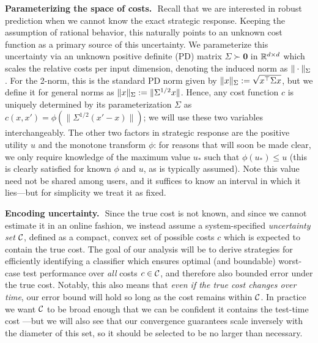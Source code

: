 \documentclass{article}
\newcommand{\costmatrix}{\Sigma}
\newcommand{\costset}{\gC}
\newcommand{\costfunc}{c}
\newcommand{\uinv}{\ensuremath{u_{*}}}
\newcommand{\psdnorm}[2]{\matrixnorm{#1}{#2}}
\theoremstyle{definition}
\renewcommand{\paragraph}[1]{{\textbf{#1}\,\,}}
\begin{document}
\paragraph{Parameterizing the space of costs.}
Recall that we are interested in robust prediction when we cannot know the exact strategic response.
Keeping the assumption of rational behavior, this naturally points to an unknown cost function as a primary source of this uncertainty.
We parameterize this uncertainty via an unknown positive definite (PD) matrix $\costmatrix \succ \mathbf{0}$ in $\mathbb{R}^{d\times d}$ which scales the relative costs per input dimension, denoting the induced norm as $\psdnorm{\cdot}{\costmatrix}$.
For the 2-norm, this is the standard PD norm given by
$\psdnorm{x}{\costmatrix} := \sqrt{x^\top \costmatrix x}$,
but we define it for general norms as $\psdnorm{x}{\costmatrix} := \norm{\costmatrix^{1/2} x}$. Hence, any cost function $\costfunc$ is uniquely determined by its parameterization $\costmatrix$ as $c(x, x') = \phi\left(\|\Sigma^{1/2}(x'-x)\|\right)$; we will use these two variables interchangeably. The other two factors in strategic response are the positive utility $u$ and the monotone transform $\phi$: for reasons that will soon be made clear, we only require knowledge of the maximum value $\uinv$ such that $\phi(\uinv) \leq u$ (this is clearly satisfied for known $\phi$ and $u$, as is typically assumed).
Note this value need not be shared among users, and it suffices to know an interval in which it lies---but for simplicity we treat it as fixed. 

\paragraph{Encoding uncertainty.}
Since the true cost is not known,
and since we cannot estimate it in an online fashion, we instead assume a system-specified \textit{uncertainty set} $\costset$, defined as a compact, convex set of possible costs $\costfunc$ which is expected to contain the true cost. The goal of our analysis will be to derive strategies for efficiently identifying a classifier which ensures optimal (and boundable) worst-case test performance over \emph{all} costs $\costfunc \in \costset$, and therefore also bounded error under the true cost. Notably, this also means that \emph{even if the true cost changes over time}, our error bound will hold so long as the cost remains within $\costset$. In practice we want $\costset$ to be broad enough that we can be confident it contains the 
test-time cost%
---but we will also see that our convergence guarantees scale inversely with the diameter of this set, so it should be selected to be no larger than necessary.
\end{document}
